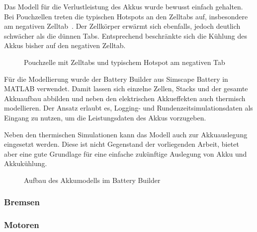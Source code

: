 Das Modell für die Verlustleistung des Akkus wurde bewusst einfach gehalten.
Bei Pouchzellen treten die typischen Hotspots an den Zelltabs auf, insbesondere
am negativen Zelltab~\cite{TODO_Quelle}. Der Zellkörper erwärmt sich ebenfalls,
jedoch deutlich schwächer als die dünnen Tabs. Entsprechend beschränkte sich die
Kühlung des Akkus bisher auf den negativen Zelltab.

\begin{figure}[htbp]
    \centering
    \caption{Pouchzelle mit Zelltabs und typischem Hotspot am negativen Tab}
    \label{fig:pouchzelle_hotspots}
\end{figure}

Für die Modellierung wurde der Battery Builder aus Simscape Battery in MATLAB
verwendet. Damit lassen sich einzelne Zellen, Stacks und der gesamte Akkuaufbau
abbilden und neben den elektrischen Akkueffekten auch thermisch modellieren.
Der Ansatz erlaubt es, Logging- und Rundenzeitsimulationsdaten als Eingang zu
nutzen, um die Leistungsdaten des Akkus vorzugeben.

Neben den thermischen Simulationen kann das Modell auch zur Akkuauslegung
eingesetzt werden. Diese ist nicht Gegenstand der vorliegenden Arbeit, bietet
aber eine gute Grundlage für eine einfache zukünftige Auslegung von Akku und
Akkukühlung.

\begin{figure}[htbp]
    \centering
    \caption{Aufbau des Akkumodells im Battery Builder}
    \label{fig:battery_builder}
\end{figure}


\subsubsection{Bremsen}
\subsubsection{Motoren}
\label{subsubsec:motoren}


